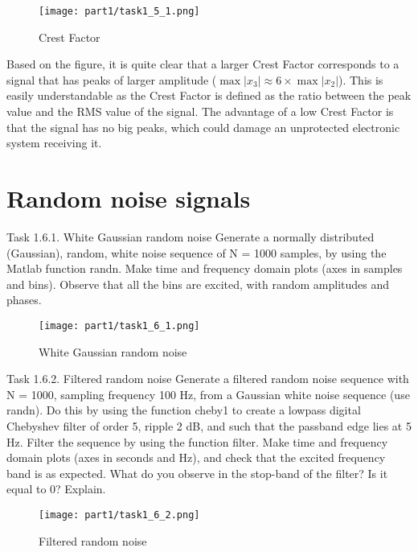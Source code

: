 \begin{figure}[H]
    \centering
    \texttt{[image: part1/task1\_5\_1.png]}
    \caption{Crest Factor}
\end{figure}

Based on the figure, it is quite clear that a larger Crest Factor corresponds to a signal that has peaks of larger amplitude ($\max |x_3| \approx 6 \times \max |x_2|$). This is easily understandable as the Crest Factor is defined as the ratio between the peak value and the RMS value of the signal. The advantage of a low Crest Factor is that the signal has no big peaks, which could damage an unprotected electronic system receiving it.

\section{Random noise signals}

\begin{Task}{Task 1.6.1. White Gaussian random noise}
    Generate a normally distributed (Gaussian), random, white noise sequence of N = 1000 samples, by using the Matlab function randn. Make time and frequency domain plots (axes in samples and bins). Observe that all the bins are excited, with random amplitudes and phases.
\end{Task}

\begin{figure}[H]
    \centering
    \texttt{[image: part1/task1\_6\_1.png]}
    \caption{White Gaussian random noise}
\end{figure}

\begin{Task}{Task 1.6.2. Filtered random noise}
    Generate a filtered random noise sequence with N = 1000, sampling frequency 100 Hz, from a Gaussian white noise sequence (use randn). Do this by using the function cheby1 to create a lowpass digital Chebyshev filter of order 5, ripple 2 dB, and such that the passband edge lies at 5 Hz. Filter the sequence by using the function filter. Make time and frequency domain plots (axes in seconds and Hz), and check that the excited frequency band is as expected. What do you observe in the stop-band of the filter? Is it equal to 0? Explain.
\end{Task}

\begin{figure}[H]
    \centering
    \texttt{[image: part1/task1\_6\_2.png]}
    \caption{Filtered random noise}
\end{figure}

